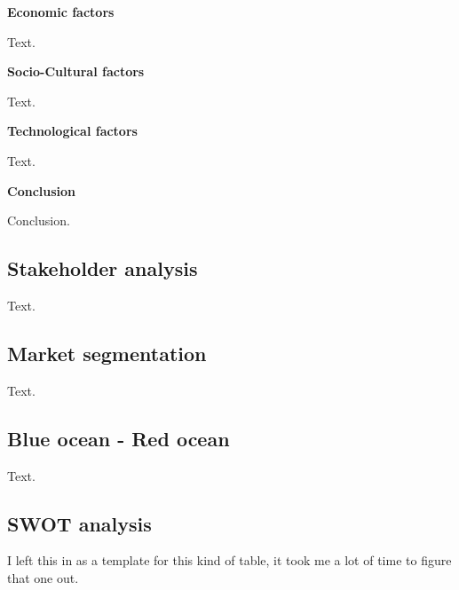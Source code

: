 \documentclass[12p]{article}
\begin{document}
\textbf{Economic factors}

Text. \medskip

\textbf{Socio-Cultural factors}

Text. \medskip

\textbf{Technological factors}

Text. \medskip

\textbf{Conclusion}

Conclusion.

\newpage


\subsection{Stakeholder analysis} \label{Stakeholder_Analysis}

Text.

\newpage


\subsection{Market segmentation} \label{MarketSegmentation}

Text.

\newpage


\subsection{Blue ocean - Red ocean} \label{BlueOceanRedOcean}

Text.

\newpage


\subsection{SWOT analysis} \label{SWOT}

I left this in as a template for this kind of table, it took me a lot of time to figure that one out.
\end{document}

